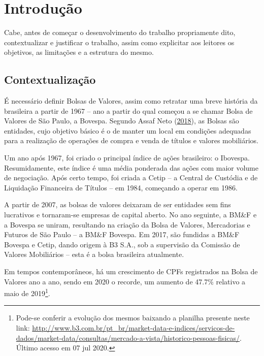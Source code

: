 \documentclass[aprovado,numbers]{coppe}
\begin{document}
  \listoffigures

  \listoftables

  \printlosymbols
  \printloabbreviations

  \mainmatter

  \hypertarget{introduuxe7uxe3o}{%
  \chapter{Introdução}\label{introduuxe7uxe3o}}

  Cabe, antes de começar o desenvolvimento do trabalho propriamente dito, contextualizar e justificar o trabalho, assim como explicitar aos leitores os objetivos, as limitações e a estrutura do mesmo.

  \hypertarget{contextualizauxe7uxe3o}{%
  \section{Contextualização}\label{contextualizauxe7uxe3o}}

  É necessário definir Bolsas de Valores, assim como retratar uma breve história da brasileira a partir de 1967 -- ano a partir do qual começou a se chamar Bolsa de Valores de São Paulo, a Bovespa. Segundo Assaf Neto (\protect\hyperlink{ref-assafneto2018}{2018}), as Bolsas são entidades, cujo objetivo básico é o de manter um local em condições adequadas para a realização de operações de compra e venda de títulos e valores mobiliários.

  Um ano após 1967, foi criado o principal índice de ações brasileiro: o Ibovespa. Resumidamente, este índice é uma média ponderada das ações com maior volume de negociação. Após certo tempo, foi criada a Cetip -- a Central de Custódia e de Liquidação Financeira de Títulos -- em 1984, começando a operar em 1986.

  A partir de 2007, as bolsas de valores deixaram de ser entidades sem fins lucrativos e tornaram-se empresas de capital aberto. No ano seguinte, a BM\&F e a Bovespa se uniram, resultando na criação da Bolsa de Valores, Mercadorias e Futuros de São Paulo -- a BM\&F Bovespa. Em 2017, são fundidas a BM\&F Bovespa e Cetip, dando origem à B3 S.A., sob a supervisão da Comissão de Valores Mobiliários -- esta é a bolsa brasileira atualmente.

  Em tempos contemporâneos, há um crescimento de CPFs registrados na Bolsa de Valores ano a ano, sendo em 2020 o recorde, um aumento de 47.7\% relativo a maio de 2019\footnote{Pode-se conferir a evolução dos mesmos baixando a planilha presente neste link: \url{http://www.b3.com.br/pt_br/market-data-e-indices/servicos-de-dados/market-data/consultas/mercado-a-vista/historico-pessoas-fisicas/}. Último acesso em 07 jul 2020.}.
\end{document}
